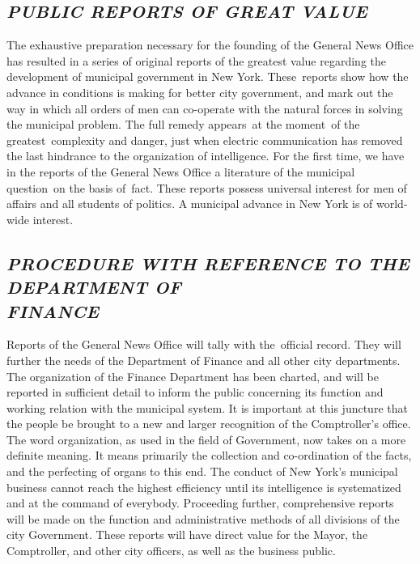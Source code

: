 \documentclass[openany,nobib]{tufte-book}
\begin{document}
\hypertarget{public-reports-of-great-value}{%
\subsection{\emph{PUBLIC REPORTS OF GREAT
VALUE}}\label{public-reports-of-great-value}}

The exhaustive preparation necessary for the founding of the General
News Office has resulted in a series of original reports of the greatest
value regarding the development of municipal government in New York.
These~reports show how the advance in conditions is making for better
city government, and mark out the way in which all orders of men can
co-operate with the natural forces in solving the municipal problem. The
full remedy appears~at the moment~of the greatest~complexity and danger,
just when electric communication has removed the last hindrance to the
organization of intelligence. For the first time, we have in the reports
of the General News Office a literature of the municipal question~on the
basis of~fact. These reports possess universal interest for men of
affairs and all students of politics. A municipal advance in New York is
of world-wide interest.~

\hypertarget{procedure-with-reference-to-the-department-of-finance}{%
\subsection{\emph{PROCEDURE WITH REFERENCE TO THE DEPARTMENT OF\\\noindent FINANCE}}\label{procedure-with-reference-to-the-department-of-finance}}

Reports of the General News Office will tally with the~official record.
They will further the needs of the Department of Finance and all other
city departments. The organization of the Finance Department has been
charted, and will be reported in sufficient detail to inform the public
concerning its function and working relation with the municipal system.
It is important at this juncture that the people be brought to a new and
larger recognition of the Comptroller's office. The word organization,
as used in the field of Government, now takes on a more definite
meaning. It means primarily the collection and co-ordination of the
facts, and the perfecting of organs to this end. The conduct of New
York's municipal business cannot reach the highest efficiency until its
intelligence is systematized and at the command of everybody. Proceeding
further, comprehensive reports will be made on the function and
administrative methods of all divisions of the city Government. These
reports will have direct value for the Mayor, the Comptroller, and other
city officers, as well as the business public.~
\end{document}
